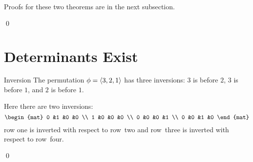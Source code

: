 \documentclass[10pt,t,serif,professionalfont]{beamer}
\begin{document}
\begin{frame}
Proofs for these two theorems are in the next subsection.

\th[th:DetsExist]

\th[th:DeterminantOfAMatrixEqualsDeterminantOfTranspose]

\pause
\medskip
{}
\pause
\pf
{}
\qed
\end{frame}




\section{Determinants Exist}
\begin{frame}{Inversion}
\df[df:Inversion]
\pause
\ex The permutation $\phi=\langle3,2,1\rangle$ has three inversions:
$3$ is before $2$, $3$ is before $1$, and 
$2$ is before $1$.
\end{frame}
\begin{frame}
\ex
Here there are two inversions:
\begin{equation*}
  \begin{mat}
    0 &1 &0 &0 \\
    1 &0 &0 &0 \\
    0 &0 &0 &1 \\
    0 &0 &1 &0
  \end{mat}
\end{equation*}
row one is inverted with respect to row~two and row~three is inverted with 
respect to row~four.
\end{frame}




\begin{frame}
\lm[le:SwapsChangeSgn]

\pause
\pf
{}
\end{frame}
\begin{frame}
\end{frame}
\begin{frame}
\qed
\end{frame}
\end{document}
